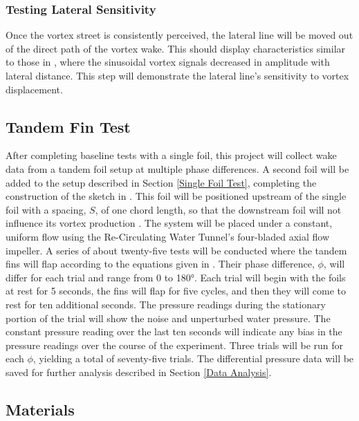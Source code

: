 \subsubsection{Testing Lateral Sensitivity} \label{Testing Lateral Sensitivity}
    
    Once the vortex street is consistently perceived, the lateral line will be moved out of the direct path of the vortex wake. This should display characteristics similar to those in , where the sinusoidal vortex signals decreased in amplitude with lateral distance. This step will demonstrate the lateral line's sensitivity to vortex displacement.

\subsection{Tandem Fin Test} \label{Tandem Fin Test}

    After completing baseline tests with a single foil, this project will collect wake data from a tandem foil setup at multiple phase differences. A second foil will be added to the setup described in Section \ref{Single Foil Test}, completing the construction of the sketch in . This foil will be positioned upstream of the single foil with a spacing, \(S\), of one chord length, so that the downstream foil will not influence its vortex production \citep{Boschitsch2014, Muscutt2017}. The system will be placed under a constant, uniform flow using the Re-Circulating Water Tunnel's four-bladed axial flow impeller. A series of about twenty-five tests will be conducted where the tandem fins will flap according to the equations given in . Their phase difference, \(\phi\), will differ for each trial and range from 0 to 180°. Each trial will begin with the foils at rest for 5 seconds, the fins will flap for five cycles, and then they will come to rest for ten additional seconds. The pressure readings during the stationary portion of the trial will show the noise and unperturbed water pressure. The constant pressure reading over the last ten seconds will indicate any bias in the pressure readings over the course of the experiment. Three trials will be run for each \(\phi\), yielding a total of seventy-five trials. The differential pressure data will be saved for further analysis described in Section \ref{Data Analysis}.
    
\subsection{Materials}

